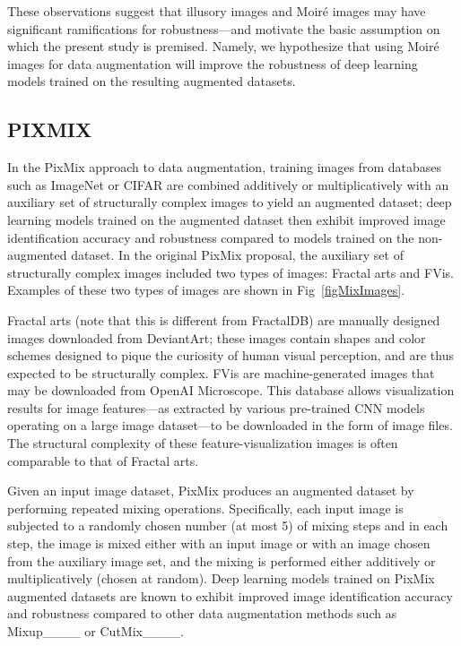 These observations suggest that illusory images and Moir\'e images
may have significant ramifications for robustness---and motivate the
basic assumption on which the present study is premised. Namely, we hypothesize
that using Moir\'e images for data augmentation will improve the 
robustness of deep learning models trained on the resulting
augmented datasets.

\subsection{PIXMIX}
\label{sec:PIXMIX}

In the PixMix approach to data augmentation,
training images from databases such as ImageNet or CIFAR
are combined additively or multiplicatively with an auxiliary set
of structurally complex images to yield an augmented dataset;
deep learning models trained on the augmented dataset then
exhibit improved image identification accuracy and robustness
compared to models trained on the non-augmented dataset.
In the original PixMix proposal, the auxiliary set of 
structurally complex images included two types of images:
Fractal arts and FVis. Examples of these two
types of images are shown in Fig~\ref{figMixImages}.

Fractal arts (note that this is different from FractalDB) are manually designed images downloaded
from DeviantArt; these images contain
shapes and color schemes designed to pique the curiosity
of human visual perception, and are thus expected to be
structurally complex.
FVis are machine-generated images that may be downloaded
from OpenAI Microscope. This database allows
visualization results for image features---as extracted
by various pre-trained CNN models operating on a large image
dataset---to be downloaded in the form of image files.
The structural complexity of these feature-visualization images
is often comparable to that of Fractal arts.

Given an input image dataset, PixMix produces an
augmented dataset by performing repeated mixing operations.
Specifically, each input image is subjected to
a randomly chosen number (at most 5) of mixing steps and 
in each step, the image is mixed either with an input
image or with an image chosen from the auxiliary image
set, and the mixing is performed either additively or
multiplicatively (chosen at random).
Deep learning models trained on PixMix augmented datasets
are known to exhibit improved image identification accuracy 
and robustness compared to other data augmentation methods
such as Mixup____ or CutMix____.

